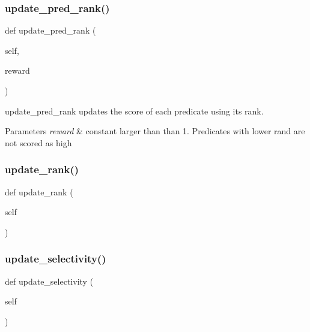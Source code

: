 \subsubsection{\texorpdfstring{update\_pred\_rank()}{update\_pred\_rank()}}
{\footnotesize\ttfamily def update\+\_\+pred\+\_\+rank (\begin{DoxyParamCaption}\item[{}]{self,  }\item[{}]{reward }\end{DoxyParamCaption})}



update\+\_\+pred\+\_\+rank updates the score of each predicate using its rank. 


\begin{DoxyParams}{Parameters}
{\em reward} & constant larger than than 1. Predicates with lower rand are not scored as high \\
\hline
\end{DoxyParams}
\mbox{\label{classdynamicfilterapp_1_1models_1_1_predicate_ab9e5706b198fa9e44ba1560ac6ed6687}} 
\subsubsection{\texorpdfstring{update\_rank()}{update\_rank()}}
{\footnotesize\ttfamily def update\+\_\+rank (\begin{DoxyParamCaption}\item[{}]{self }\end{DoxyParamCaption})}

\mbox{\label{classdynamicfilterapp_1_1models_1_1_predicate_a20d11566ab0f56ccf8baac7a18809185}} 
\subsubsection{\texorpdfstring{update\_selectivity()}{update\_selectivity()}}
{\footnotesize\ttfamily def update\+\_\+selectivity (\begin{DoxyParamCaption}\item[{}]{self }\end{DoxyParamCaption})}



